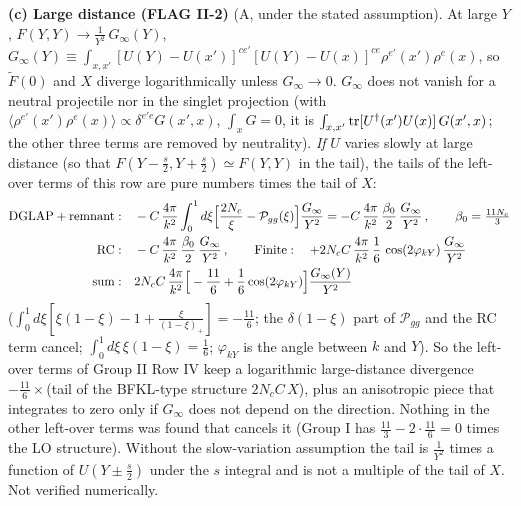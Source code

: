 \documentclass[9pt]{article}
\numberwithin{equation}{section}
\begin{document}
\noindent\textbf{(c) Large distance (FLAG II-2)} (A, under the stated assumption). At large $Y$, $F(Y,Y)\to\frac{1}{Y^{2}}\,G_{\infty}(Y)$, $G_{\infty}(Y)\equiv\int_{x,x'}[U(Y)-U(x')]^{ce'}[U(Y)-U(x)]^{ce}\rho^{e'}(x')\rho^{e}(x)$, so $\tilde F(0)$ and $X$ diverge logarithmically unless $G_{\infty}\to0$. $G_{\infty}$ does not vanish for a neutral projectile nor in the singlet projection (with $\langle\rho^{e'}(x')\rho^{e}(x)\rangle\propto\delta^{e'e}G(x',x)$, $\int_{x}G=0$, it is $\int_{x,x'}{\rm tr}[U^{\dagger}(x')U(x)]\,G(x',x)$; the other three terms are removed by neutrality). \emph{If} $U$ varies slowly at large distance (so that $F(Y-\frac s2,Y+\frac s2)\simeq F(Y,Y)$ in the tail), the tails of the left-over terms of this row are pure numbers times the tail of $X$:
\begin{align}
\text{DGLAP}+\text{remnant}:&\quad-C\,\frac{4\pi}{k^{2}}\int_{0}^{1}d\xi\Big[\frac{2N_{c}}{\xi}-\mathcal P_{gg}(\xi)\Big]\frac{G_{\infty}}{Y^{2}}=-C\,\frac{4\pi}{k^{2}}\,\frac{\beta_{0}}{2}\,\frac{G_{\infty}}{Y^{2}}\,,\qquad \beta_{0}=\tfrac{11N_{c}}{3}\notag\\
\text{RC}:&\quad-C\,\frac{4\pi}{k^{2}}\,\frac{\beta_{0}}{2}\,\frac{G_{\infty}}{Y^{2}}\,,\qquad
\text{Finite}:\quad+2N_{c}C\,\frac{4\pi}{k^{2}}\,\frac16\,\cos(2\varphi_{kY})\,\frac{G_{\infty}}{Y^{2}}\notag\\
\text{sum}:&\quad 2N_{c}C\,\frac{4\pi}{k^{2}}\Big[-\frac{11}{6}+\frac16\cos(2\varphi_{kY})\Big]\frac{G_{\infty}(Y)}{Y^{2}}\notag
\end{align}
($\int_{0}^{1}d\xi[\xi(1-\xi)-1+\frac{\xi}{(1-\xi)_{+}}]=-\frac{11}{6}$; the $\delta(1-\xi)$ part of $\mathcal P_{gg}$ and the RC term cancel; $\int_{0}^{1}d\xi\,\xi(1-\xi)=\frac16$; $\varphi_{kY}$ is the angle between $k$ and $Y$). So the left-over terms of Group II Row IV keep a logarithmic large-distance divergence $-\frac{11}{6}\times$(tail of the BFKL-type structure $2N_{c}C\,X$), plus an anisotropic piece that integrates to zero only if $G_{\infty}$ does not depend on the direction. Nothing in the other left-over terms was found that cancels it (Group I has $\frac{11}{3}-2\cdot\frac{11}{6}=0$ times the LO structure). Without the slow-variation assumption the tail is $\frac{1}{Y^{2}}$ times a function of $U(Y\pm\frac s2)$ under the $s$ integral and is not a multiple of the tail of $X$. Not verified numerically.
\end{document}
